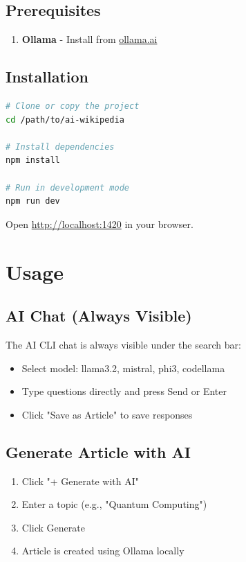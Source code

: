\documentclass[11pt,a4paper]{article}
\begin{document}
\subsection{Prerequisites}

\begin{enumerate}
    \item \textbf{Ollama} - Install from \url{ollama.ai}
\end{enumerate}

\subsection{Installation}

\begin{lstlisting}[language=bash]
# Clone or copy the project
cd /path/to/ai-wikipedia

# Install dependencies
npm install

# Run in development mode
npm run dev
\end{lstlisting}

Open \url{http://localhost:1420} in your browser.

\section{Usage}

\subsection{AI Chat (Always Visible)}

The AI CLI chat is always visible under the search bar:
\begin{itemize}
    \item Select model: llama3.2, mistral, phi3, codellama
    \item Type questions directly and press Send or Enter
    \item Click "Save as Article" to save responses
\end{itemize}

\subsection{Generate Article with AI}

\begin{enumerate}
    \item Click "+ Generate with AI"
    \item Enter a topic (e.g., "Quantum Computing")
    \item Click Generate
    \item Article is created using Ollama locally
\end{enumerate}
\end{document}
